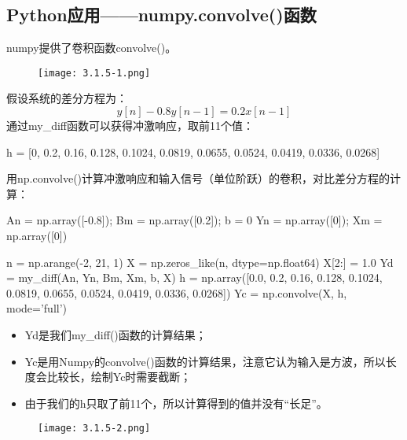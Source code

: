\subsection{Python应用——numpy.convolve()函数}

numpy提供了卷积函数convolve()。
\begin{figure}[h]
\centering
\texttt{[image: 3.1.5-1.png]}
\end{figure}

假设系统的差分方程为：
\[
y\left[ n \right] -0.8y\left[ n-1 \right] =0.2x\left[ n-1 \right]
\]
通过my\_diff函数可以获得冲激响应，取前11个值：
\begin{center}
h = [0, 0.2, 0.16, 0.128, 0.1024, 0.0819, 0.0655, 0.0524, 0.0419, 0.0336, 0.0268]
\end{center}
用np.convolve()计算冲激响应和输入信号（单位阶跃）的卷积，对比差分方程的计算：

\begin{python}
An = np.array([-0.8]); Bm = np.array([0.2]); b = 0
Yn = np.array([0]);    Xm = np.array([0])

n  = np.arange(-2, 21, 1)
X  = np.zeros_like(n, dtype=np.float64)
X[2:] = 1.0
Yd = my_diff(An, Yn, Bm, Xm, b, X)
h  = np.array([0.0, 0.2, 0.16, 0.128, 0.1024, 0.0819, 0.0655, 0.0524, 0.0419, 0.0336, 0.0268])
Yc = np.convolve(X, h, mode='full')
\end{python}

\begin{itemize}
    \item Yd是我们my\_diff()函数的计算结果；
    \item Yc是用Numpy的convolve()函数的计算结果，注意它认为输入是方波，所以长度会比较长，绘制Yc时需要截断；
    \item 由于我们的h只取了前11个，所以计算得到的值并没有“长足”。
\end{itemize}

\begin{figure}[h]
\centering
\texttt{[image: 3.1.5-2.png]}
\end{figure}




